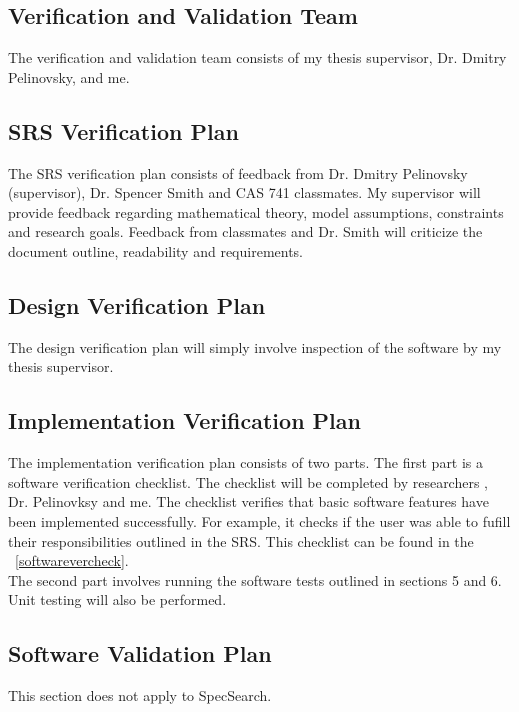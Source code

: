 \documentclass[12pt, titlepage]{article}
\begin{document}
\subsection{Verification and Validation Team}
\label{VnVTeam}
The verification and validation team consists of my thesis supervisor, Dr. 
Dmitry Pelinovsky, and me. \\

\subsection{SRS Verification Plan}
\label{SRSVerPlan}
The SRS verification plan consists of feedback from Dr. Dmitry Pelinovsky 
(supervisor), Dr. Spencer Smith and CAS 741 classmates. My supervisor will 
provide feedback regarding mathematical theory, model assumptions, constraints 
and research goals. Feedback from classmates and Dr. Smith will criticize the 
document outline, readability and requirements. 

\subsection{Design Verification Plan}
\label{DesignVerificationPlan}
The design verification plan will simply involve inspection of the software by 
my thesis supervisor. 

\subsection{Implementation Verification Plan}
\label{ImplementationVerPlan}
The implementation verification plan consists of two parts. The first part 
is a software verification checklist. The checklist will be completed by 
researchers , Dr. Pelinovksy and me. The 
checklist verifies that basic software features have been implemented 
successfully. 
For example, it checks if the user was able to fufill their responsibilities 
outlined in the SRS. 
This checklist can be found in the ~\ref{softwarevercheck}.\\

 The 
second part involves running the software tests 
outlined in sections 5 and 6. Unit testing will also be performed. 

\subsection{Software Validation Plan}
\label{SoftwareValidationPlan}
This section does not apply to SpecSearch. 
\end{document}
